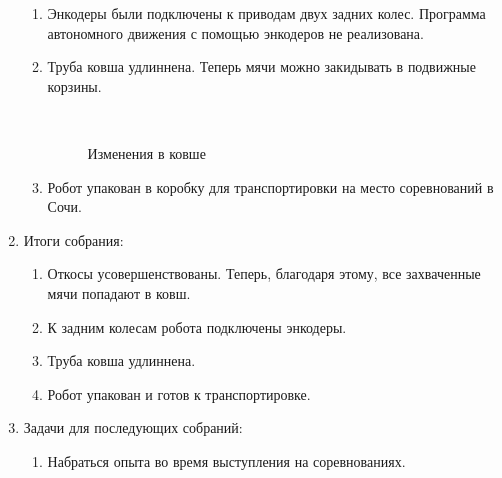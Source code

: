 \begin{enumerate}
\begin{enumerate}
      \item Энкодеры были подключены к приводам двух задних колес. Программа автономного движения с помощью энкодеров не реализована.
      
      \item Труба ковша удлиннена. Теперь мячи можно закидывать в подвижные корзины.
      
      \begin{figure}[H]
      	\begin{minipage}[h]{0.2\linewidth}
      		\center  
      	\end{minipage}
      	\begin{minipage}[h]{0.6\linewidth}
      		\caption{Изменения в ковше}
      	\end{minipage}
      \end{figure}
      
      \item Робот упакован в коробку для транспортировки на место соревнований в Сочи.
          
    \end{enumerate}
    
	\item Итоги собрания: 
	\begin{enumerate}
	  \item Откосы усовершенствованы. Теперь, благодаря этому, все захваченные мячи попадают в ковш.
	  
      \item К задним колесам робота подключены энкодеры.
      
      \item Труба ковша удлиннена.
      
      \item Робот упакован и готов к транспортировке.
      
    \end{enumerate}
    
	\item Задачи для последующих собраний:
	\begin{enumerate}
	  \item Набраться опыта во время выступления на соревнованиях.
	  
    \end{enumerate}     
\end{enumerate}
\fillpage